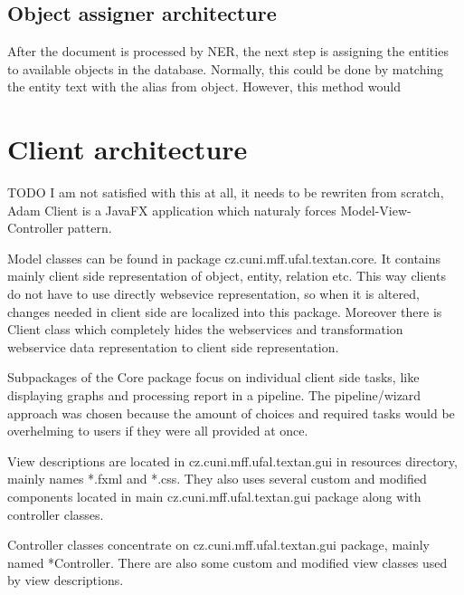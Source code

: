 \subsection{Object assigner architecture} %


After the document is processed by NER, the next step is assigning the entities
to available objects in the database. Normally, this could be done by matching
the entity text with the alias from object. However, this method would %


\section{Client architecture}

TODO I am not satisfied with this at all, it needs to be rewriten from scratch, Adam
\textan{} Client is a JavaFX application which naturaly forces Model-View-Controller
pattern.

Model classes can be found in package cz.cuni.mff.ufal.textan.core. It contains
mainly client side representation of object, entity, relation etc. This way
clients do not have to use directly websevice representation, so when it is
altered, changes needed in client side are localized into this package. Moreover
there is Client class which completely hides the webservices and transformation
webservice data representation to client side representation.

Subpackages of the Core package focus on individual client side tasks, like
displaying graphs and processing report in a pipeline. The pipeline/wizard
approach was chosen because the amount of choices and required tasks would
be overhelming to users if they were all provided at once.

View descriptions are located in cz.cuni.mff.ufal.textan.gui in resources
directory, mainly names *.fxml and *.css. They also uses several custom and
modified components located in main cz.cuni.mff.ufal.textan.gui package along
with controller classes.

Controller classes concentrate on cz.cuni.mff.ufal.textan.gui package,
mainly named *Controller. There are also some custom and modified view classes
used by view descriptions.

